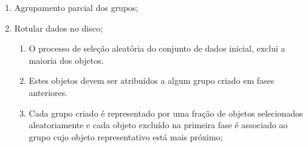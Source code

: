 \begin{enumerate}
    \item Agrupamento parcial dos grupos;
    \item Rotular dados no disco;
        \begin{enumerate}
            \item O processo de seleção aleatória do conjunto de dados inicial, exclui a maioria dos objetos.
            \item Estes objetos devem ser atribuídos a algum grupo criado em fases anteriores.
            \item Cada grupo criado é representado por uma fração de objetos selecionados aleatoriamente e cada objeto excluído na primeira fase é associado ao grupo cujo objeto representativo está mais próximo;
        \end{enumerate}
\end{enumerate}

